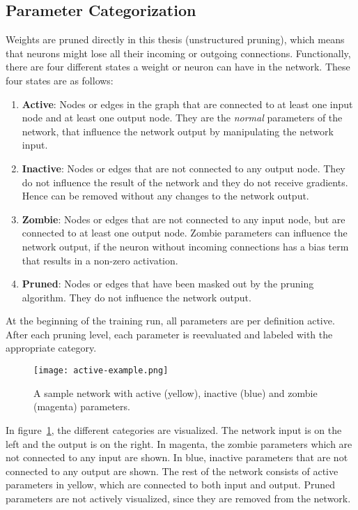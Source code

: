 \subsection{Parameter Categorization}
Weights are pruned directly in this thesis (unstructured pruning), which means that neurons might lose all their incoming or outgoing connections. 
Functionally, there are four different states a weight or neuron can have in the network.
These four states are as follows:
\begin{enumerate}
\item \textbf{Active}: Nodes or edges in the graph that are connected to at least one input node and at least one output node. They are the \textit{normal} parameters of the network, that influence the network output by manipulating the network input.
\item \textbf{Inactive}: Nodes or edges that are not connected to any output node. They do not influence the result of the network and they do not receive gradients. Hence can be removed without any changes to the network output.
\item \textbf{Zombie}: Nodes or edges that are not connected to any input node, but are connected to at least one output node. Zombie parameters can influence the network output, if the neuron without incoming connections has a bias term that results in a non-zero activation.
\item \textbf{Pruned}: Nodes or edges that have been masked out by the pruning algorithm. They do not influence the network output.
\end{enumerate}

At the beginning of the training run, all parameters are per definition active.
After each pruning level, each parameter is reevaluated and labeled with the appropriate category.

\begin{figure}[ht] %
    \centering
    \texttt{[image: active-example.png]}
    \caption[Active, inactive and zombies example]{
    A sample network with active (yellow), inactive (blue) and zombie (magenta) parameters.
    }\label{fig:parameter_categories}
\end{figure}

In figure~\ref{fig:parameter_categories}, the different categories are visualized.
The network input is on the left and the output is on the right.
In magenta, the zombie parameters which are not connected to any input are shown.
In blue, inactive parameters that are not connected to any output are shown.
The rest of the network consists of active parameters in yellow, which are connected to both input and output.
Pruned parameters are not actively visualized, since they are removed from the network.

